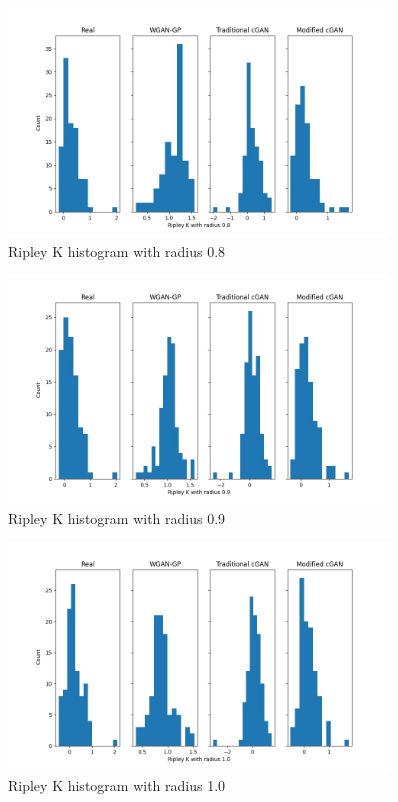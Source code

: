 \documentclass{Configuration_Files/PoliMi3i_thesis}
\begin{document}
\begin{figure}[H]
    \centering
    \includegraphics[width=0.9\textwidth]{ripk_8.jpg}
    \caption{Ripley K histogram with radius 0.8}
    \label{fig:ripk8}
\end{figure}
\begin{figure}[H]
    \centering
    \includegraphics[width=0.9\textwidth]{ripk_9.jpg}
    \caption{Ripley K histogram with radius 0.9}
    \label{fig:ripk9}
\end{figure}
\begin{figure}[H]
    \centering
    \includegraphics[width=0.9\textwidth]{ripk_10.jpg}
    \caption{Ripley K histogram with radius 1.0}
    \label{fig:ripk10}
\end{figure}
\end{document}

